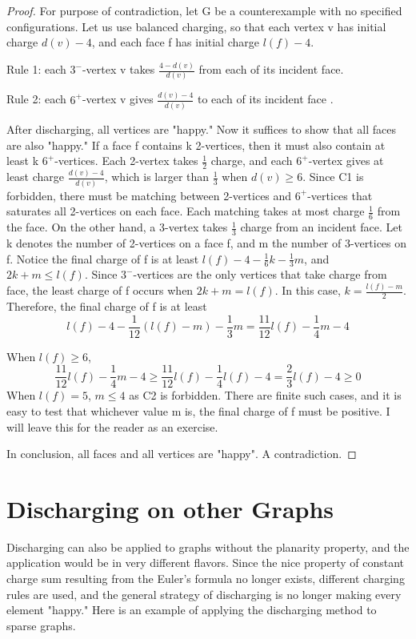 \documentclass[a4paper, 11pt]{article} %
\begin{document}
\begin{proof}
For purpose of contradiction, let G be a counterexample with no specified configurations. Let us use balanced charging, so that each vertex v has initial charge $d(v) - 4$, and each face f has initial charge $l(f) - 4$.

Rule 1: each $3^{-}$-vertex v takes $\frac{4-d(v)}{d(v)}$ from each of its incident face.

Rule 2: each $6^{+}$-vertex v gives $\frac{d(v) - 4}{d(v)}$ to each of its incident face \cite{cranston2013guide}.

After discharging, all vertices are "happy." Now it suffices to show that all faces are also "happy." If a face f contains k 2-vertices, then it must also contain at least k $6^{+}$-vertices. Each 2-vertex takes $\frac{1}{2}$ charge, and each $6^{+}$-vertex gives at least charge $\frac{d(v) - 4}{d(v)}$, which is larger than $\frac{1}{3}$ when $d(v) \geq 6$. Since C1 is forbidden, there must be matching between 2-vertices and $6^{+}$-vertices that saturates all 2-vertices on each face. Each matching takes at most charge $\frac{1}{6}$ from the face. On the other hand, a 3-vertex takes $\frac{1}{3}$ charge from an incident face. Let k denotes the number of 2-vertices on a face f, and m the number of 3-vertices on f. Notice the final charge of f is at least $l(f) - 4 - \frac{1}{6}k - \frac{1}{3}m$, and $2k + m \leq l(f)$. Since $3^{-}$-vertices are the only vertices that take charge from face, the least charge of f occurs when $2k + m = l(f)$. In this case, $k = \frac{l(f) - m}{2}$. Therefore, the final charge of f is at least
\[l(f) - 4 - \frac{1}{12}(l(f) - m) - \frac{1}{3}m = \frac{11}{12}l(f) - \frac{1}{4}m - 4\]

When $l(f)\geq6$, 
\[\frac{11}{12}l(f) - \frac{1}{4}m - 4 \geq \frac{11}{12}l(f) - \frac{1}{4}l(f)  - 4 = \frac{2}{3}l(f) - 4 \geq 0\]
When $l(f) = 5$, $m \leq 4$ as C2 is forbidden. There are finite such cases, and it is easy to test that whichever value m is, the final charge of f must be positive. I will leave this for the reader as an exercise.

In conclusion, all faces and all vertices are "happy". A contradiction.
\end{proof}

\section{Discharging on other Graphs}

Discharging can also be applied to graphs without the planarity property, and the application would be in very different flavors. Since the nice property of constant charge sum resulting from the Euler's formula no longer exists, different charging rules are used, and the general strategy of discharging is no longer making every element "happy." Here is an example of applying the discharging method to sparse graphs.
\end{document}
